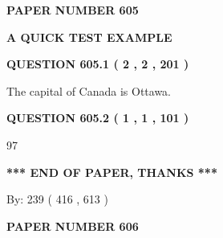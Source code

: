 \documentclass[12pt]{article}
\begin{document}
   
   
   
\newpage 
\setcounter{page}{ 
   605001 } 
   
   
   
   
 {\textbf{ \Large{ PAPER NUMBER  605  }}}
   
   
\vspace{0.2in}
   
   
   
   
   
   
 \vspace{0.2in}
{\LARGE {\textbf{ A QUICK TEST EXAMPLE}}}
   
   
  
\vspace{0.2in}
  
{\textbf{\Large{QUESTION
605.1 
 ( 2 , 2 , 201 )
}}}
  
  
 
 
\noindent{}
 
 
The capital of Canada is Ottawa.
 
 
 
 
  
\vspace{0.2in}
  
{\textbf{\Large{QUESTION
605.2 
 ( 1 , 1 , 101 )
}}}
  
  
 
 
\noindent{}

97
 
 
   
   
 \vspace{0.2in}
 
   
   
   
   
\vspace{1.0in} 
{\textbf{\large{ *** END OF PAPER, THANKS *** }}} 
   
   
\hspace{1.0in} By: 
 239 ( 416 ,  613 )
   
   
   
   
\newpage 
\setcounter{page}{ 
   606001 } 
   
   
   
   
 {\textbf{ \Large{ PAPER NUMBER  606  }}}
   
\end{document}
